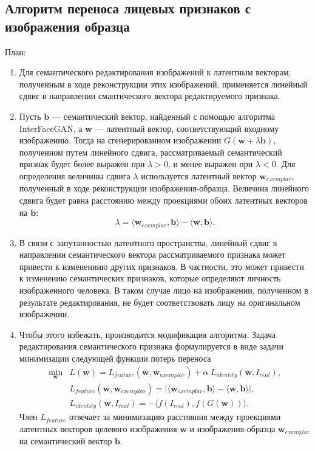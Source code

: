 \subsection{Алгоритм переноса лицевых признаков с изображения образца}
План:
\begin{enumerate}
\item
Для семантического редактирования изображений к латентным векторам, полученным в ходе реконструкции этих изображений, применяется линейный сдвиг в направлении смантического вектора редактируемого признака.

\item
Пусть $\mathbf b$ --- семантический вектор, найденный с помощью алгоритма InterFaceGAN, а $\mathbf w$ --- латентный вектор, соответствующий входному изображению.
Тогда на сгенерированном изображении $G(\mathbf w + \lambda \mathbf b)$, полученном путем линейного сдвига, рассматриваемый семантический признак будет более выражен при $\lambda > 0$, и менее выражен при $\lambda  < 0$.
Для определения величины сдвига $\lambda$ используется латентный вектор $\mathbf w_{exemplar}$, полученный в ходе реконструкции изображения-образца. 
Величина линейного сдвига будет равна расстоянию между проекциями обоих латентных векторов на $\mathbf b$: 
$$\lambda = \langle \mathbf w_{exemplar}, \mathbf b \rangle - \langle \mathbf w, \mathbf b \rangle .$$

\item
В связи с запутанностью латентного пространства, линейный сдвиг в направлении семантического вектора рассматриваемого признака может привести к измененнию других признаков. 
В частности, это может привести к изменению семантических признаков, которые определяют личность изображенного человека. 
В таком случае лицо на изображении, полученном в результате редактирования, не будет соответствовать лицу на оригинальном изображении.

\item
Чтобы этого избежать, производится модификация алгоритма. 
Задача редактирования семантического признака формулируется в виде задачи минимизации следующей функции потерь переноса
\begin{align*}
\min_{\mathbf w} &L(\mathbf w) = L_{feature}(\mathbf w, \mathbf w_{exemplar}) + \alpha~L_{identity}(\mathbf w, I_{real}), \\
&L_{feature}(\mathbf w, \mathbf w_{exemplar}) = \lvert \langle \mathbf w_{exemplar}, \mathbf b \rangle - \langle \mathbf w, \mathbf b \rangle \rvert,\\
&L_{identity}(\mathbf w, I_{real}) = - \langle f(I_{real}), f(G(\mathbf w)) \rangle.
\end{align*}
Член $L_{feature}$ отвечает за минимизацию расстояния между проекциями латентных векторов целевого изображения $\mathbf w$ и изображения-образца $\mathbf w_{exemplar}$ на семантический вектор $\mathbf b$.


\end{enumerate}
